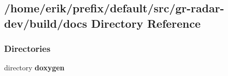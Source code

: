 \subsection{/home/erik/prefix/default/src/gr-\/radar-\/dev/build/docs Directory Reference}
\label{dir_8d71a9df5453cf1a457037373ea787b9}
\subsubsection*{Directories}
\begin{DoxyCompactItemize}
\item 
directory {\bf doxygen}
\end{DoxyCompactItemize}
